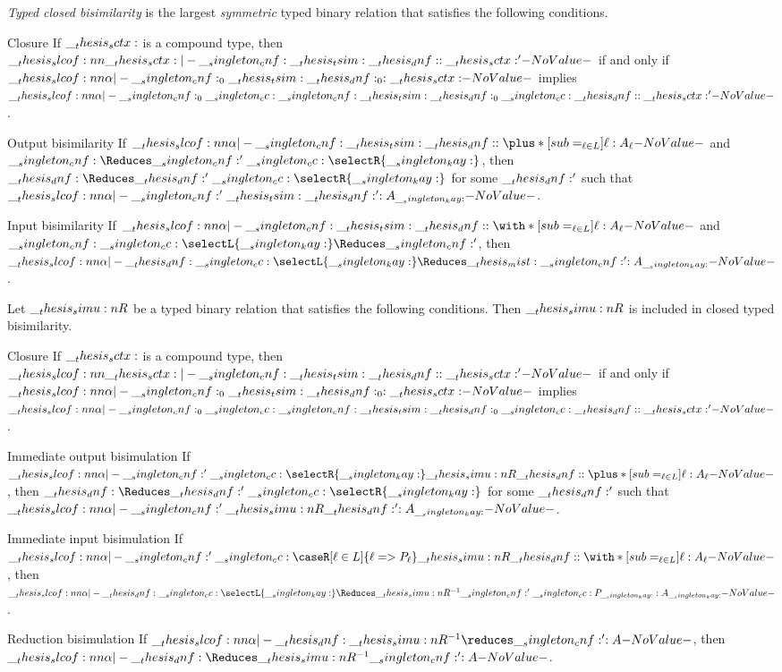 \begin{definition}
  \emph{Typed closed bisimilarity} is the largest \emph{symmetric} typed binary relation that satisfies the following conditions.
  \begin{thmdescription}
  \item[Closure]
    If $\__thesis_sctx:$ is a compound type, then $\slcof{\sctx |- \cnf \tsim \dnf : \sctx'}$ if and only if $\slcof{\alpha |- \cnf_0 \tsim \dnf_0 : \sctx}$ implies $\slcof{\alpha |- \cnf_0 \cc \cnf \tsim \dnf_0 \cc \dnf : \sctx'}$.
  \item[Output bisimilarity]
    If $\slcof{\alpha |- \cnf \tsim \dnf : \plus*[sub=_{\ell \in L}]{\ell:A_{\ell}}}$ and $\cnf \Reduces \cnf' \cc \selectR{\kay}$, then $\dnf \Reduces \dnf' \cc \selectR{\kay}$ for some $\__thesis_dnf:'$ such that $\slcof{\alpha |- \cnf' \tsim \dnf' : A_{\kay}}$.
  \item[Input bisimilarity]
    If $\slcof{\alpha |- \cnf \tsim \dnf : \with*[sub=_{\ell \in L}]{\ell:A_{\ell}}}$ and $\cnf \cc \selectL{\kay} \Reduces \cnf'$, then $\slcof{\alpha |- \dnf \cc \selectL{\kay} \Reduces\mist \cnf' : A_{\kay}}$.
  \end{thmdescription}
\end{definition}


\begin{conjecture}
  Let $\__thesis_simu:n {R}$ be a typed binary relation that satisfies the following conditions.
  Then $\__thesis_simu:n {R}$ is included in closed typed bisimilarity.
  \begin{thmdescription}
  \item[Closure]
    If $\__thesis_sctx:$ is a compound type, then $\slcof{\sctx |- \cnf \tsim \dnf : \sctx'}$ if and only if $\slcof{\alpha |- \cnf_0 \tsim \dnf_0 : \sctx}$ implies $\slcof{\alpha |- \cnf_0 \cc \cnf \tsim \dnf_0 \cc \dnf : \sctx'}$.
  \item[Immediate output bisimulation]
    If $\slcof{\alpha |- \cnf' \cc \selectR{\kay} \simu{R} \dnf : \plus*[sub=_{\ell \in L}]{\ell:A_{\ell}}}$, then $\dnf \Reduces \dnf' \cc \selectR{\kay}$ for some $\__thesis_dnf:'$ such that $\slcof{\alpha |- \cnf' \simu{R} \dnf' : A_{\kay}}$.
  \item[Immediate input bisimulation]
    If $\slcof{\alpha |- \cnf' \cc \caseR[\ell \in L]{\ell => P_{\ell}} \simu{R} \dnf : \with*[sub=_{\ell \in L}]{\ell:A_{\ell}}}$, then $\slcof{\alpha |- \dnf \cc \selectL{\kay} \Reduces\simu{R}^{-1} \cnf' \cc P_{\kay} : A_{\kay}}$.
  \item[Reduction bisimulation]
    If $\slcof{\alpha |- \dnf \simu{R}^{-1}\reduces \cnf' : A}$, then $\slcof{\alpha |- \dnf \Reduces\simu{R}^{-1} \cnf' : A}$.
  \end{thmdescription}
\end{conjecture}


